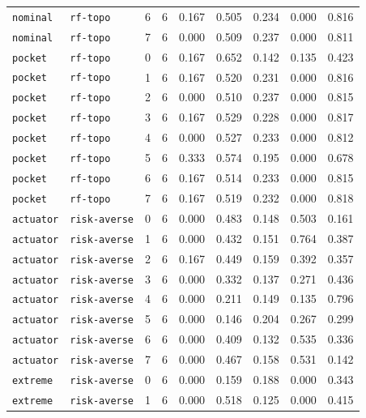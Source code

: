 \documentclass{article}
\begin{document}
\begin{center}
\begin{tabular}{lllcccccc}
\texttt{nominal} & \texttt{rf-topo} & 6 & 6 & 0.167 & 0.505 & 0.234 & 0.000 & 0.816 \\
\texttt{nominal} & \texttt{rf-topo} & 7 & 6 & 0.000 & 0.509 & 0.237 & 0.000 & 0.811 \\
\texttt{pocket} & \texttt{rf-topo} & 0 & 6 & 0.167 & 0.652 & 0.142 & 0.135 & 0.423 \\
\texttt{pocket} & \texttt{rf-topo} & 1 & 6 & 0.167 & 0.520 & 0.231 & 0.000 & 0.816 \\
\texttt{pocket} & \texttt{rf-topo} & 2 & 6 & 0.000 & 0.510 & 0.237 & 0.000 & 0.815 \\
\texttt{pocket} & \texttt{rf-topo} & 3 & 6 & 0.167 & 0.529 & 0.228 & 0.000 & 0.817 \\
\texttt{pocket} & \texttt{rf-topo} & 4 & 6 & 0.000 & 0.527 & 0.233 & 0.000 & 0.812 \\
\texttt{pocket} & \texttt{rf-topo} & 5 & 6 & 0.333 & 0.574 & 0.195 & 0.000 & 0.678 \\
\texttt{pocket} & \texttt{rf-topo} & 6 & 6 & 0.167 & 0.514 & 0.233 & 0.000 & 0.815 \\
\texttt{pocket} & \texttt{rf-topo} & 7 & 6 & 0.167 & 0.519 & 0.232 & 0.000 & 0.818 \\
\texttt{actuator} & \texttt{risk-averse} & 0 & 6 & 0.000 & 0.483 & 0.148 & 0.503 & 0.161 \\
\texttt{actuator} & \texttt{risk-averse} & 1 & 6 & 0.000 & 0.432 & 0.151 & 0.764 & 0.387 \\
\texttt{actuator} & \texttt{risk-averse} & 2 & 6 & 0.167 & 0.449 & 0.159 & 0.392 & 0.357 \\
\texttt{actuator} & \texttt{risk-averse} & 3 & 6 & 0.000 & 0.332 & 0.137 & 0.271 & 0.436 \\
\texttt{actuator} & \texttt{risk-averse} & 4 & 6 & 0.000 & 0.211 & 0.149 & 0.135 & 0.796 \\
\texttt{actuator} & \texttt{risk-averse} & 5 & 6 & 0.000 & 0.146 & 0.204 & 0.267 & 0.299 \\
\texttt{actuator} & \texttt{risk-averse} & 6 & 6 & 0.000 & 0.409 & 0.132 & 0.535 & 0.336 \\
\texttt{actuator} & \texttt{risk-averse} & 7 & 6 & 0.000 & 0.467 & 0.158 & 0.531 & 0.142 \\
\texttt{extreme} & \texttt{risk-averse} & 0 & 6 & 0.000 & 0.159 & 0.188 & 0.000 & 0.343 \\
\texttt{extreme} & \texttt{risk-averse} & 1 & 6 & 0.000 & 0.518 & 0.125 & 0.000 & 0.415 \\
\bottomrule
\end{tabular}
\end{center}
\end{document}
